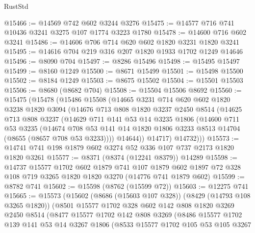 \begin{lexlean}{RustStd}
\begin{coremodule}
@15466 := @14569 @742 @602 @3244 @3276
@15475 := @14577 @716 @741 @10436 @3241 @3275 @107 @1774 @3223 @1780
@15478 := @14600 @716 @602 @3241
@15486 := @14606 @706 @714 @620 @602 @1820 @3231 @1820 @3241
@15495 := @14616 @704 @219 @316 @207 @1820 @1933 @1702 @1249 @14646
@15496 := @8090 @704
@15497 := @8286 @15496
@15498 := @15495 @15497
@15499 := @8160 @1249
@15500 := @8671 @15499
@15501 := @15498 @15500
@15502 := @8184 @1249
@15503 := @8675 @15502
@15504 := @15501 @15503
@15506 := @8680 (@8682 @704)
@15508 := @15504 @15506 @8692
@15560 := @15475
    (@15478
      (@15486
        @15508
        (@14665
          @3231
          @714
          @620
          @602
          @1820
          @3238
          @1820
          @3094
          (@14676
            @713
            @808
            @1820
            @3237
            @2450
            @8514
            (@14625
              @713
              @808
              @3237
              (@14629
                @711
                @141
                @53
                @14
                @3235
                @1806
                (@14600
                  @711
                  @53
                  @3235
                  (@14674
                    @708
                    @53
                    @141
                    @14
                    @1820
                    @1806
                    @3233
                    @8513
                    @14704
                    (@8655 (@8657 @708 @53 @3233))))
                @14644))
            @14717)
          @14732)))
@15573 := @14741 @741 @198 @1879 @602 @3274 @52 @336 @107 @737 @2173 @1820 @1820 @3261
@15577 := @8371 (@8374 (@12241 @8379)) @14289
@15598 := @14737
    @15577
    @1702
    @602
    @1879
    @741
    @107
    @1879
    @602
    @1897
    @72
    @328
    @108
    @719
    @3265
    @1820
    @1820
    @3270
    (@14776 @741 @1879 @602)
@15599 := @8782 @741
@15602 := @15598 (@8762 (@15599 @72))
@15603 := @12275 @741
@15665 := @15573
    (@15602
      (@8686 (@15603 @107 @328))
      (@8429 (@14793 @108 @3265 @1820))
      (@8501
        @15577
        @1702
        @328
        @602
        @142
        @808
        @1820
        @3269
        @2450
        @8514
        (@8477
          @15577
          @1702
          @142
          @808
          @3269
          (@8486
            @15577
            @1702
            @139
            @141
            @53
            @14
            @3267
            @1806
            (@8533
              @15577
              @1702
              @105
              @53
              @105
              @3267

\end{coremodule}
\end{lexlean}
